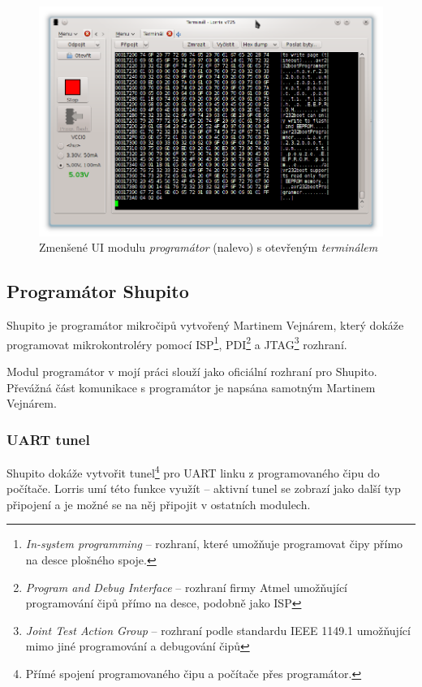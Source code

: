 \documentclass[12pt, a4paper, oneside]{article}
\newcommand{\It}{\textit}  %
\begin{document}
\begin{figure}[H]
\begin{center}
\includegraphics[width=\textwidth]{img/programmer_mini.png}
\caption{Zmenšené UI modulu \It{programátor} (nalevo) s otevřeným \It{terminálem}}
\label{prog_mini}
\end{center}
\end{figure}

\subsection{Programátor Shupito}
Shupito je programátor mikročipů vytvořený Martinem Vejnárem, který dokáže programovat mikrokontroléry pomocí ISP\footnote{\It{In-system programming} -- rozhraní, které umožňuje programovat čipy přímo na desce plošného spoje.}, PDI\footnote{\It{Program and Debug Interface} -- rozhraní firmy Atmel umožňující programování čipů přímo na desce, podobně jako ISP} a JTAG\footnote{\It{Joint Test Action Group} -- rozhraní podle standardu IEEE 1149.1 umožňující mimo jiné programování a debugování čipů} rozhraní. 

Modul programátor v mojí práci slouží jako oficiální rozhraní pro Shupito. Převážná část komunikace s programátor je napsána samotným Martinem Vejnárem.

\subsubsection{UART tunel}
\label{tunel}
Shupito dokáže vytvořit tunel\footnote{Přímé spojení programovaného čipu a počítače přes programátor.} pro UART linku z programovaného čipu do počítače. Lorris umí této funkce využít -- aktivní tunel se zobrazí jako další typ připojení a je možné se na něj připojit v ostatních modulech.
\end{document}
